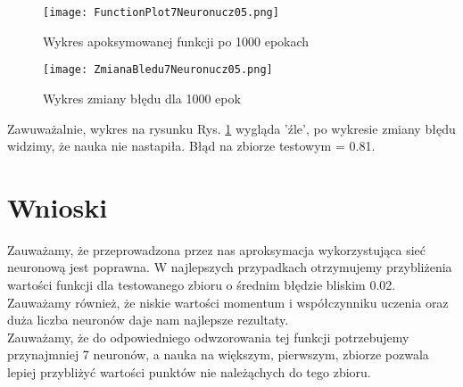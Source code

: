 \documentclass[12pt]{article}
\begin{document}
\begin{figure}[!htb]
 \centering
 \texttt{[image: FunctionPlot7Neuronucz05.png]}
 \caption{Wykres apoksymowanej funkcji po 1000 epokach}
 \vspace{-0.3cm}
 \label{WykresFun12}
\end{figure}

\begin{figure}[!htb]
 \centering
 \texttt{[image: ZmianaBledu7Neuronucz05.png]}
 \vspace{-0.3cm}
 \caption{Wykres zmiany błędu dla 1000 epok}
 \label{WykresBlad12}
\end{figure}
\newpage
Zawuważalnie, wykres na rysunku Rys. \ref{WykresFun12} wygląda 'źle', po wykresie zmiany błędu widzimy, że nauka nie nastapiła.
Błąd na zbiorze testowym = 0.81.
\newpage
\section{Wnioski}

Zauważamy, że przeprowadzona przez nas aproksymacja wykorzystująca sieć neuronową jest poprawna. W najlepszych przypadkach otrzymujemy przybliżenia wartości funkcji dla testowanego zbioru o średnim błędzie bliskim 0.02. \\ Zauważamy również, że niskie wartości momentum i współczynniku uczenia oraz duża liczba neuronów daje nam najlepsze rezultaty.\\ Zauważamy, że do odpowiedniego odwzorowania tej funkcji potrzebujemy przynajmniej 7 neuronów, a nauka na większym, pierwszym, zbiorze pozwala lepiej przybliżyć wartości punktów nie należąchych do tego zbioru.






\renewcommand\refname{Bibliografia}


\end{document}
